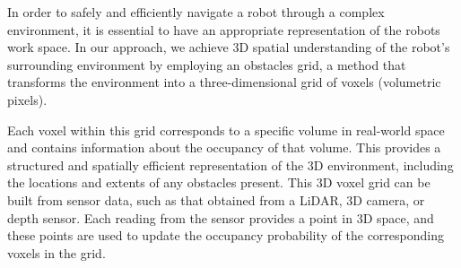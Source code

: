 \documentclass[a4paper]{article}
\newcommand\todocomment[1]{\textcolor{red}{||\\ #1\\||}}
\begin{document}
In order to safely and efficiently navigate a robot through a complex environment, it is essential to have an appropriate representation of the robots work space. In our approach, we achieve 3D spatial understanding of the robot's surrounding environment by employing an obstacles grid, a method that transforms the environment into a three-dimensional grid of voxels (volumetric pixels).

Each voxel within this grid corresponds to a specific volume in real-world space and contains information about the occupancy of that volume. This provides a structured and spatially efficient representation of the 3D environment, including the locations and extents of any obstacles present. This 3D voxel grid can be built from sensor data, such as that obtained from a LiDAR, 3D camera, or depth sensor. Each reading from the sensor provides a point in 3D space, and these points are used to update the occupancy probability of the corresponding voxels in the grid.



%
%


\end{document}
